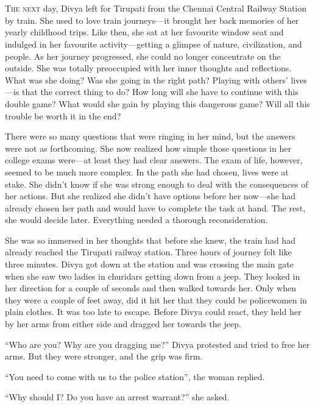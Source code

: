 \chapter{}

\lettrine{T}{he next} day, Divya left for Tirupati from the Chennai Central
Railway Station by train. She used to love train journeys—it brought her back
memories of her yearly childhood trips. Like then, she sat at her favourite
window seat and indulged in her favourite activity—getting a glimpse of nature,
civilization, and people. As her journey progressed, she could no longer concentrate
on the outside. She was totally preoccupied with her inner thoughts and reflections.
What was she doing?  Was she going in the right path? Playing with others'
lives—is that the correct thing to do? How long will she have to continue with
this double game? What would she gain by playing this dangerous game? Will all
this trouble be worth it in the end?

There were so many questions that were ringing in her mind, but the answers were
not as forthcoming. She now realized how simple those questions in her college
exams were—at least they had clear answers. The exam of life, however, seemed
to be much more complex. In the path she had chosen, lives were at stake. She
didn't know if she was strong enough to deal with the consequences of her
actions. But she realized she didn't have options before her now—she had already
chosen her path and would have to complete the task at hand. The rest, she would
decide later. Everything needed a thorough reconsideration.

She was so immersed in her thoughts that before she knew, the train had had
already reached the Tirupati railway station. Three hours of journey felt like
three minutes. Divya got down at the station and was crossing the main gate when
she saw two ladies in churidars getting down from a jeep. They looked in her
direction for a couple of seconds and then walked towards her. Only when they
were a couple of feet away, did it hit her that they could be policewomen in
plain clothes. It was too late to escape.  Before Divya could react, they held
her by her arms from either side and dragged her towards the jeep.

“Who are you? Why are you dragging me?” Divya protested and tried to free her
arms. But they were stronger, and the grip was firm.

“You need to come with us to the police station”, the woman replied.

“Why should I? Do you have an arrest warrant?” she asked.

